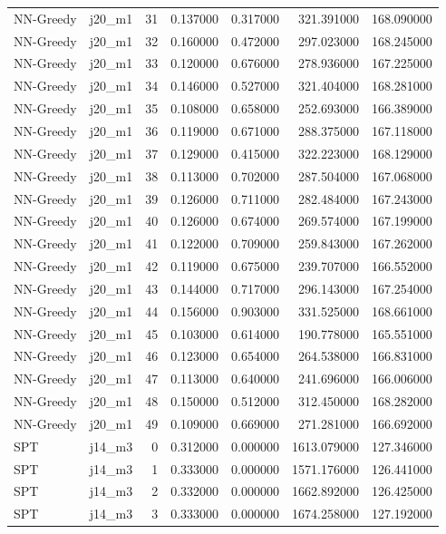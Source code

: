 \begin{tabular}{llrrrrr}
NN-Greedy & j20_m1 & 31 & 0.137000 & 0.317000 & 321.391000 & 168.090000 \\
NN-Greedy & j20_m1 & 32 & 0.160000 & 0.472000 & 297.023000 & 168.245000 \\
NN-Greedy & j20_m1 & 33 & 0.120000 & 0.676000 & 278.936000 & 167.225000 \\
NN-Greedy & j20_m1 & 34 & 0.146000 & 0.527000 & 321.404000 & 168.281000 \\
NN-Greedy & j20_m1 & 35 & 0.108000 & 0.658000 & 252.693000 & 166.389000 \\
NN-Greedy & j20_m1 & 36 & 0.119000 & 0.671000 & 288.375000 & 167.118000 \\
NN-Greedy & j20_m1 & 37 & 0.129000 & 0.415000 & 322.223000 & 168.129000 \\
NN-Greedy & j20_m1 & 38 & 0.113000 & 0.702000 & 287.504000 & 167.068000 \\
NN-Greedy & j20_m1 & 39 & 0.126000 & 0.711000 & 282.484000 & 167.243000 \\
NN-Greedy & j20_m1 & 40 & 0.126000 & 0.674000 & 269.574000 & 167.199000 \\
NN-Greedy & j20_m1 & 41 & 0.122000 & 0.709000 & 259.843000 & 167.262000 \\
NN-Greedy & j20_m1 & 42 & 0.119000 & 0.675000 & 239.707000 & 166.552000 \\
NN-Greedy & j20_m1 & 43 & 0.144000 & 0.717000 & 296.143000 & 167.254000 \\
NN-Greedy & j20_m1 & 44 & 0.156000 & 0.903000 & 331.525000 & 168.661000 \\
NN-Greedy & j20_m1 & 45 & 0.103000 & 0.614000 & 190.778000 & 165.551000 \\
NN-Greedy & j20_m1 & 46 & 0.123000 & 0.654000 & 264.538000 & 166.831000 \\
NN-Greedy & j20_m1 & 47 & 0.113000 & 0.640000 & 241.696000 & 166.006000 \\
NN-Greedy & j20_m1 & 48 & 0.150000 & 0.512000 & 312.450000 & 168.282000 \\
NN-Greedy & j20_m1 & 49 & 0.109000 & 0.669000 & 271.281000 & 166.692000 \\
SPT & j14_m3 & 0 & 0.312000 & 0.000000 & 1613.079000 & 127.346000 \\
SPT & j14_m3 & 1 & 0.333000 & 0.000000 & 1571.176000 & 126.441000 \\
SPT & j14_m3 & 2 & 0.332000 & 0.000000 & 1662.892000 & 126.425000 \\
SPT & j14_m3 & 3 & 0.333000 & 0.000000 & 1674.258000 & 127.192000 \\

\end{tabular}
